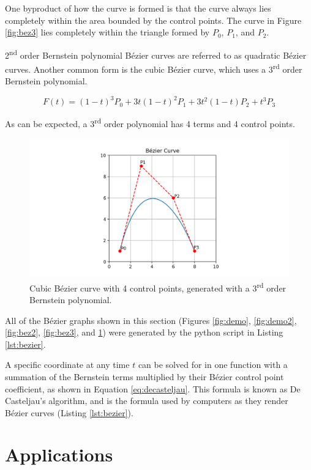 \documentclass[12pt,letterpaper]{article}
\begin{document}
One byproduct of how the curve is formed is that the curve always lies completely within the area bounded by the control points. The curve in Figure \ref{fig:bez3} lies completely within the triangle formed by $P_0$, $P_1$, and $P_2$.

2\textsuperscript{nd} order Bernstein polynomial B\'ezier curves are referred to as quadratic B\'ezier curves. Another common form is the cubic B\'ezier curve, which uses a 3\textsuperscript{rd} order Bernstein polynomial.

$$F(t)=(1-t)^3 P_0+3t (1-t)^2 P_1+3t^2 (1-t) P_2+t^3 P_3$$

As can be expected, a 3\textsuperscript{rd} order polynomial has 4 terms and 4 control points.

\begin{figure}[H]
    \centering
    \includegraphics[width=15cm]{Figure_5}
    \caption{Cubic B\'ezier curve with 4 control points, generated with a 3\textsuperscript{rd} order Bernstein polynomial.}
    \label{fig:bez4}
\end{figure}

All of the B\'ezier graphs shown in this section (Figures \ref{fig:demo}, \ref{fig:demo2}, \ref{fig:bez2}, \ref{fig:bez3}, and \ref{fig:bez4}) were generated by the python script in Listing \ref{lst:bezier}.

A specific coordinate at any time $t$ can be solved for in one function with a summation of the Bernstein terms multiplied by their B\'ezier control point coefficient, as shown in Equation \ref{eq:decasteljau}. This formula is known as De Casteljau's algorithm, and is the formula used by computers as they render B\'ezier curves (Listing \ref{lst:bezier}).

\section{Applications}
\end{document}
